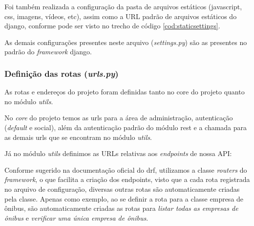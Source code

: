 

Foi também realizada a configuração da pasta de arquivos estáticos (javascript, css, imagens, vídeos, etc), assim como a URL padrão de arquivos estáticos do \gls{django}, conforme pode ser visto no trecho de código \ref{cod:staticsettings}.

As demais configurações presentes neste arquivo (\textit{settings.py}) são as presentes no padrão do \textit{framework} \gls{django}.

\subsubsection{Definição das rotas (\textit{urls.py})}
As rotas e endereços do projeto foram definidas tanto no core do projeto quanto no módulo \textit{utils}.

No \textit{core} do projeto temos as urls para a área de administração, autenticação (\textit{default} e social), além da autenticação padrão do módulo \gls{rest} e a chamada para as demais urls que se encontram no módulo \textit{utils}.


Já no módulo \textit{utils} definimos as URLs relativas aos \textit{endpoints} de nossa API:


Conforme sugerido na documentação oficial do \gls{drf}, utilizamos a classe \textit{routers} do \textit{framework}, o que facilita a criação dos endpoints, visto que a cada rota registrada no arquivo de configuração, diversas outras rotas são automaticamente criadas pela classe. Apenas como exemplo, ao se definir a rota para a classe empresa de ônibus, são automaticamente criadas as rotas para \textit{listar todas as empresas de ônibus} e \textit{verificar uma única empresa de ônibus}.


